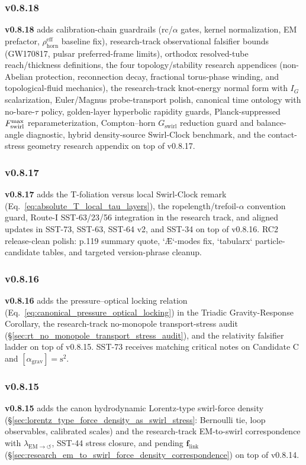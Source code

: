 \documentclass[11pt]{article}
\theoremstyle{definition}
\theoremstyle{plain}
\theoremstyle{remark}
\newcommand{\rhohorn}{\rho_{\mathrm{horn}}^{\mathrm{eff}}}
\begin{document}
        \subsubsection{v0.8.18}
            \textbf{v0.8.18} adds calibration-chain guardrails (rc/$\alpha$ gates, kernel normalization, EM prefactor, $\rhohorn$ baseline fix), research-track observational falsifier bounds (GW170817, pulsar preferred-frame limits), orthodox resolved-tube reach/thickness definitions, the four topology/stability research appendices (non-Abelian protection, reconnection decay, fractional torus-phase winding, and topological-fluid mechanics), the research-track knot-energy normal form with $I_G$ scalarization, Euler/Magnus probe-transport polish, canonical time ontology with no-bare-$\tau$ policy, golden-layer hyperbolic rapidity guards, Planck-suppressed $F_{\rm swirl}^{\max}$ reparameterization, Compton--horn $G_{\mathrm{swirl}}$ reduction guard and balance-angle diagnostic, hybrid density-source Swirl-Clock benchmark, and the contact-stress geometry research appendix on top of v0.8.17.

        \subsubsection{v0.8.17}
            \textbf{v0.8.17} adds the T-foliation versus local Swirl-Clock remark (Eq.~\ref{eq:absolute_T_local_tau_layers}), the ropelength/trefoil-$\alpha$ convention guard, Route-I SST-63/23/56 integration in the research track, and aligned updates in SST-73, SST-63, SST-64 v2, and SST-34 on top of v0.8.16. RC2 release-clean polish: p.119 summary quote, `\AE{}`-modes fix, `tabularx` particle-candidate tables, and targeted version-phrase cleanup.

        \subsubsection{v0.8.16}
            \textbf{v0.8.16} adds the pressure--optical locking relation (Eq.~\ref{eq:canonical_pressure_optical_locking}) in the Triadic Gravity-Response Corollary, the research-track no-monopole transport-stress audit (\S\ref{sec:rt_no_monopole_transport_stress_audit}), and the relativity falsifier ladder on top of v0.8.15. SST-73 receives matching critical notes on Candidate C and $[\alpha_{\mathrm{grav}}]=\mathrm{s^2}$.

        \subsubsection{v0.8.15}
            \textbf{v0.8.15} adds the canon hydrodynamic Lorentz-type swirl-force density (\S\ref{sec:lorentz_type_force_density_as_swirl_stress}: Bernoulli tie, loop observables, calibrated scales) and the research-track EM-to-swirl correspondence with $\lambda_{\mathrm{EM}\to\circlearrowleft}$, SST-44 stress closure, and pending $\mathbf f_{\mathrm{link}}$ (\S\ref{sec:research_em_to_swirl_force_density_correspondence}) on top of v0.8.14.
\end{document}
